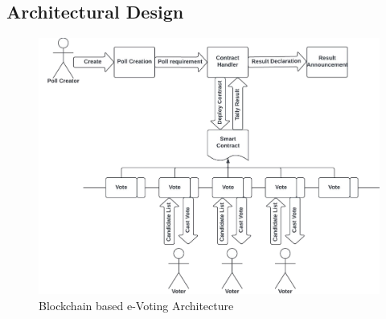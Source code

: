 \documentclass[oneside, 12pt]{book}
\begin{document}
		\subsection{Architectural Design}
		\begin{figure}[H]
			\includegraphics[width=\linewidth]{./Resources/architecture.png}
		    \caption{Blockchain based e-Voting Architecture}
		    \label{fig:annexure-architecture}
		\end{figure}
	\newpage
\end{document}
